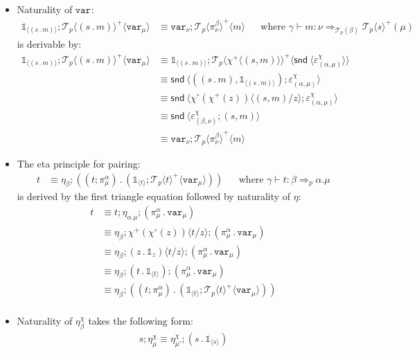\documentclass[10pt]{article}
\theoremstyle{definition}
\newcommand\dsd[1]{\ensuremath{\mathsf{#1}}}
\newcommand{\tcell}{\Rightarrow}
\newcommand{\app}[2]{\ensuremath{#1 \: #2}}
\newcommand{\snd}[1]{\app{\dsd{snd}}{#1}}
\newcommand\TermTwoT[5]{\ensuremath{#1 \vdash {#2} : #3 \tcell_{#5} #4}}
\newcommand\TrPlus[2]{\ensuremath{{#1}^+(#2)}}
\newcommand\TrCirc[2]{\ensuremath{{#1}^\circ(#2)}}
\newcommand\El[2]{\mathcal{T}_{#1}(#2)}
\newcommand\ApEl[2]{\mathcal{T}_{#1}\langle#2\rangle}
\newcommand\bdot[0]{\mathbin{.}}
\newcommand\ap[2]{\ensuremath{#1 \langle #2 \rangle }}
\newcommand\ApPlus[2]{\ensuremath{{#1}^+ \langle #2 \rangle }}
\newcommand\One{\ensuremath{\mathds{1}}}
\newcommand\var[1]{\ensuremath{\mathtt{var}_{#1}}}
\newcommand\ApOne[1]{\ensuremath{\One_{\langle {#1} \rangle }}}
\begin{document}
\begin{itemize}
\item Naturality of $\var{}$:
\begin{align}
\label{beta-var}
\ApOne{(s \bdot m)};\ApPlus{\ApEl{p}{(s \bdot m)}}{\var{\mu}} &\equiv \var{\nu};\ApPlus{\ApEl{p}{\pi^\beta_\nu}}{m}  && \text{where } \TermTwoT{\gamma}{m}{\nu}{\TrPlus{\ApEl{p}{s}}{\mu}}{\El{p}{\beta}}
\end{align}
is derivable by:
\begin{align*}
\ApOne{(s \bdot m)};\ApPlus{\ApEl{p}{(s \bdot m)}}{\var{\mu}} 
&\equiv \ApOne{(s \bdot m)};\ApPlus{\ApEl{p}{\ApPlus{\chi}{(s, m)}}}{\ap \snd {\varepsilon^\chi_{(\alpha, \mu)}}} \\
&\equiv \ap \snd {((s \bdot m), \ApOne{(s \bdot m)});\varepsilon^\chi_{(\alpha, \mu)}} \\
&\equiv \ap \snd {\ap{\TrCirc{\chi}{\TrPlus{\chi}{z}}}{(s, m)/z};\varepsilon^\chi_{(\alpha, \mu)}} \\
&\equiv \ap \snd {\varepsilon^\chi_{(\beta, \nu)};(s, m)} \\
&\equiv \var{\nu}; \ApPlus{\ApEl{p}{\pi^\beta_{\nu}}}{m} 
\end{align*}

\item The eta principle for pairing:
\begin{align}
\label{eta-pi-var}
t &\equiv \eta_\beta;((t;\pi_\mu^\alpha) \bdot (\ApOne{t}; \ApPlus{\ApEl{p}{t}}{\var{\mu}})) && \text{where } \TermTwoT{\gamma}{t}{\beta}{\alpha.\mu}{p}
\end{align}
is derived by the first triangle equation followed by naturality of $\eta$:
\begin{align*}
t &\equiv t;\eta_{\alpha.\mu};(\pi_\mu^\alpha \bdot \var{\mu}) \\
&\equiv \eta_\beta;\ap{\TrPlus{\chi}{\TrCirc{\chi}{z}}}{t/z};(\pi_\mu^\alpha \bdot \var{\mu}) \\
&\equiv \eta_\beta;\ap{(z \bdot \One_z)}{t/z};(\pi_\mu^\alpha \bdot \var{\mu}) \\
&\equiv \eta_\beta;(t \bdot \ApOne{t});(\pi_\mu^\alpha \bdot \var{\mu}) \\
&\equiv \eta_\beta;((t;\pi_\mu^\alpha) \bdot (\ApOne{t}; \ApPlus{\ApEl{p}{t}}{\var{\mu}})) \\
\end{align*}

\item Naturality of $\eta^\chi_\beta$ takes the following form:
\begin{align*}
s;\eta^\chi_\mu \equiv \eta^\chi_{\mu'} ; (s \bdot \ApOne{s})
\end{align*}

\end{itemize}
\end{document}
